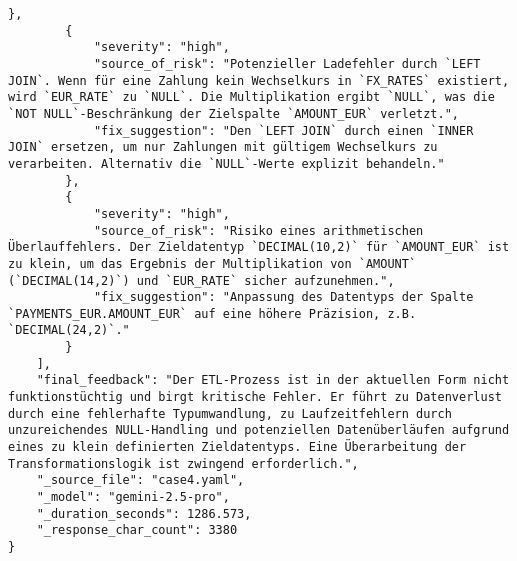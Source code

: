 \begin{lstlisting}[caption={Ausgabe: Gemini 2.5 Pro Anwendungsfall 4 Hauptdurchlauf},label={gemini_case4_prompt1}]
        },
        {
            "severity": "high",
            "source_of_risk": "Potenzieller Ladefehler durch `LEFT JOIN`. Wenn für eine Zahlung kein Wechselkurs in `FX_RATES` existiert, wird `EUR_RATE` zu `NULL`. Die Multiplikation ergibt `NULL`, was die `NOT NULL`-Beschränkung der Zielspalte `AMOUNT_EUR` verletzt.",
            "fix_suggestion": "Den `LEFT JOIN` durch einen `INNER JOIN` ersetzen, um nur Zahlungen mit gültigem Wechselkurs zu verarbeiten. Alternativ die `NULL`-Werte explizit behandeln."
        },
        {
            "severity": "high",
            "source_of_risk": "Risiko eines arithmetischen Überlauffehlers. Der Zieldatentyp `DECIMAL(10,2)` für `AMOUNT_EUR` ist zu klein, um das Ergebnis der Multiplikation von `AMOUNT` (`DECIMAL(14,2)`) und `EUR_RATE` sicher aufzunehmen.",
            "fix_suggestion": "Anpassung des Datentyps der Spalte `PAYMENTS_EUR.AMOUNT_EUR` auf eine höhere Präzision, z.B. `DECIMAL(24,2)`."
        }
    ],
    "final_feedback": "Der ETL-Prozess ist in der aktuellen Form nicht funktionstüchtig und birgt kritische Fehler. Er führt zu Datenverlust durch eine fehlerhafte Typumwandlung, zu Laufzeitfehlern durch unzureichendes NULL-Handling und potenziellen Datenüberläufen aufgrund eines zu klein definierten Zieldatentyps. Eine Überarbeitung der Transformationslogik ist zwingend erforderlich.",
    "_source_file": "case4.yaml",
    "_model": "gemini-2.5-pro",
    "_duration_seconds": 1286.573,
    "_response_char_count": 3380
}
\end{lstlisting}

